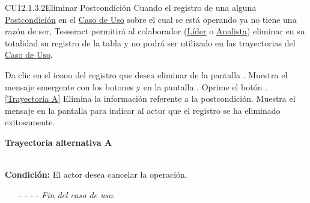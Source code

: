 	\begin{UseCase}{CU12.1.3.2}{Eliminar Postcondición}{
		Cuando el registro de una  alguna \hyperlink{entidadPostcondicion}{Postcondición} en el \hyperlink{casoUso}{Caso de Uso} sobre el cual se está operando ya no tiene una razón de ser, Tesseract permitirá al colaborador (\hyperlink{jefe}{Líder} o \hyperlink{analista}{Analista}) eliminar en su totalidad su registro de la tabla y no podrá ser utilizado en las trayectorias del \hyperlink{casoUso}{Caso de Uso}.
	}
\end{UseCase}
\begin{UCtrayectoria}
	\UCpaso[\UCactor] Da clic en el icono \eliminar del registro que desea eliminar de la pantalla .
	\UCpaso[\UCsist] Muestra el mensaje emergente  con los botones  y  en la pantalla .
	\UCpaso[\UCactor] Oprime el botón . \hyperlink{CU12-1-3-2:TAA}{[Trayectoria A]}
	\UCpaso[\UCsist] Elimina la información referente a la postcondición.
	\UCpaso[\UCsist] Muestra el mensaje  en la pantalla  para indicar al actor que el registro se ha eliminado exitosamente.
\end{UCtrayectoria}		
\hypertarget{CU12-1-3-2:TAA}{\textbf{Trayectoria alternativa A}}\\
\noindent \textbf{Condición:} El actor desea cancelar la operación.
\begin{enumerate}
	\UCpaso[\UCactor] Solicita cancelar la operación oprimiendo el botón  de la pantalla .
	\UCpaso[\UCsist] Muestra la pantalla .
	\item[- -] - - {\em {Fin del caso de uso}}.%
\end{enumerate}
